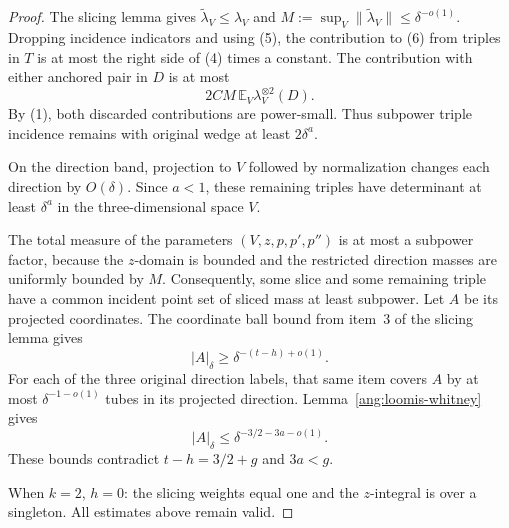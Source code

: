 \begin{proof}
The slicing lemma gives
$\widetilde\lambda_V\le\lambda_V$ and
$M:=\sup_V\|\widetilde\lambda_V\|\le\delta^{-o(1)}$.
Dropping incidence indicators and using (5), the contribution to (6) from triples in $T$ is at most the right side of (4) times a constant. The contribution with either anchored pair in $D$ is at most
\[
 2CM\,\mathbb E_V\lambda_V^{\otimes2}(D).
\]
By (1), both discarded contributions are power-small. Thus subpower triple incidence remains with original wedge at least $2\delta^a$.

On the direction band, projection to $V$ followed by normalization changes each direction by $O(\delta)$. Since $a<1$, these remaining triples have determinant at least $\delta^a$ in the three-dimensional space $V$.

The total measure of the parameters $(V,z,p,p',p'')$ is at most a subpower factor, because the $z$-domain is bounded and the restricted direction masses are uniformly bounded by $M$. Consequently, some slice and some remaining triple have a common incident point set of sliced mass at least subpower. Let $A$ be its projected coordinates. The coordinate ball bound from item~3 of the slicing lemma gives
\[
 |A|_\delta\ge\delta^{-(t-h)+o(1)}.
\]
For each of the three original direction labels, that same item covers $A$ by at most $\delta^{-1-o(1)}$ tubes in its projected direction. Lemma~\ref{ang:loomis-whitney} gives
\[
 |A|_\delta\le\delta^{-3/2-3a-o(1)}.
\]
These bounds contradict $t-h=3/2+g$ and $3a<g$.

When $k=2$, $h=0$: the slicing weights equal one and the $z$-integral is over a singleton. All estimates above remain valid.
\end{proof}
